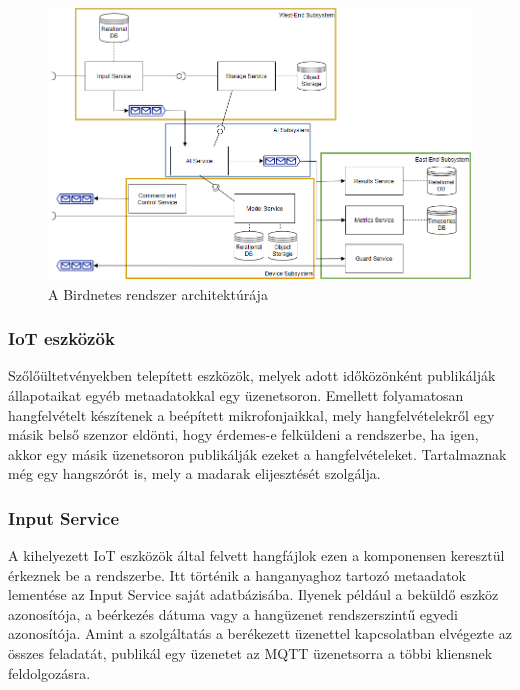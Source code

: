 \begin{figure}[!ht]
\centering
\includegraphics[width=150mm, keepaspectratio]{figures/architecture-redesigned.png}
\caption{A Birdnetes rendszer architektúrája}
\label{fig:birdnetes-components}
\end{figure}

\subsubsection{IoT eszközök}
Szőlőültetvényekben telepített eszközök, melyek adott időközönként publikálják állapotaikat egyéb metaadatokkal egy üzenetsoron.
Emellett folyamatosan hangfelvételt készítenek a beépített mikrofonjaikkal, mely hangfelvételekről egy másik belső szenzor eldönti,
hogy érdemes-e felküldeni a rendszerbe, ha igen, akkor egy másik üzenetsoron publikálják ezeket a hangfelvételeket.
Tartalmaznak még egy hangszórót is, mely a madarak elijesztését szolgálja.

\subsubsection{Input Service}
A kihelyezett IoT eszközök által felvett hangfájlok ezen a komponensen keresztül érkeznek be a rendszerbe.
Itt történik a hanganyaghoz tartozó metaadatok lementése az Input Service saját adatbázisába. 
Ilyenek például a beküldő eszköz azonosítója, a beérkezés dátuma vagy a hangüzenet rendszerszintű egyedi azonosítója.
Amint a szolgáltatás a berékezett üzenettel kapcsolatban elvégezte az összes feladatát, 
publikál egy üzenetet az MQTT üzenetsorra a többi kliensnek feldolgozásra.

